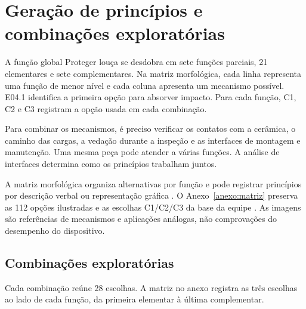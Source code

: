 \section{Geração de princípios e combinações exploratórias}
A função global Proteger louça se desdobra em sete funções parciais, 21 elementares e sete complementares. Na matriz morfológica, cada linha representa uma função de menor nível e cada coluna apresenta um mecanismo possível. E04.1 identifica a primeira opção para absorver impacto. Para cada função, C1, C2 e C3 registram a opção usada em cada combinação.

Para combinar os mecanismos, é preciso verificar os contatos com a cerâmica, o caminho das cargas, a vedação durante a inspeção e as interfaces de montagem e manutenção. Uma mesma peça pode atender a várias funções. A análise de interfaces determina como os princípios trabalham juntos.

A matriz morfológica organiza alternativas por função e pode registrar princípios por descrição verbal ou representação gráfica \citep[pp.~266, 269]{back2008}. O Anexo~\ref{anexo:matriz} preserva as 112 opções ilustradas e as escolhas C1/C2/C3 da base da equipe \citep{baseequipe2026}. As imagens são referências de mecanismos e aplicações análogas, não comprovações do desempenho do dispositivo.

\subsection{Combinações exploratórias}
Cada combinação reúne 28 escolhas. A matriz no anexo registra as três escolhas ao lado de cada função, da primeira elementar à última complementar.

